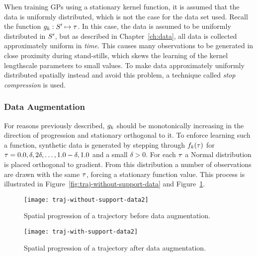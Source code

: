 When training GPs using a stationary kernel function, it is assumed
that the data is uniformly distributed, which is not the case for the
data set used. Recall the function $g_{k} : S' \mapsto
\tau$. In this case, the data is assumed to be uniformly
distributed in $S'$, but as described in Chapter~\ref{ch:data},
all data is collected approximately uniform in \textit{time}. This causes many
observations to be generated in close proximity during stand-stills, which skews the
learning of the kernel lengthscale parameters to small values. To
make data approximately uniformly distributed spatially instead and 
avoid this problem, a technique called \textit{stop compression} is used.

\subsubsection{Data Augmentation}
\label{sec:data-augmentation}
For reasons previously described, $g_{k}$ should be monotonically increasing in
the direction of progression and stationary orthogonal to it.
To enforce learning such a function, synthetic data is generated by
stepping through $f_{k}(\tau)$ for $\tau = 0.0,
\delta, 2\delta, \dots, 1.0-\delta, 1.0$ and a small $\delta > 0$. For each
$\tau$ a Normal distribution is placed orthogonal to
gradient. From this distribution a number of observations are drawn with the same 
$\tau$, forcing a stationary function value. This process is illustrated in
Figure~\ref{fig:traj-without-support-data} and
Figure~\ref{fig:traj-with-support-data}. 
\begin{figure}
  \begin{minipage}{.46\textwidth}
    \texttt{[image: traj-without-support-data2]}
    \caption{Spatial progression of a trajectory
      before data augmentation.}\label{fig:traj-without-support-data}
  \end{minipage}
  \hspace{5pt}
  \begin{minipage}{.46\textwidth}
    \texttt{[image: traj-with-support-data2]}
    \caption{Spatial progression of a trajectory
      after data augmentation. }\label{fig:traj-with-support-data}
  \end{minipage}
\end{figure}

